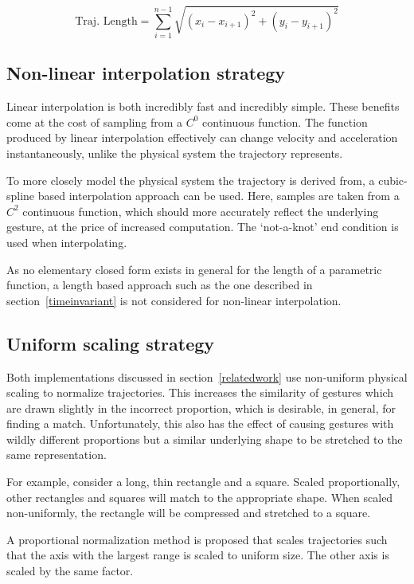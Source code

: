 \documentclass[12pt,journal,compsoc]{IEEEtran}
\begin{document}
\begin{equation} \label{distanceinterpolation}
\textrm{Traj. Length} = \sum_{i=1}^{n-1}{\sqrt{(x_i - x_{i+1})^2 + (y_i - y_{i+1})^2}}
\end{equation}

\subsection{Non-linear interpolation strategy}

Linear interpolation is both incredibly fast and incredibly simple. These benefits come at 
the cost of sampling from a $C^0$ continuous function. The function produced by linear
interpolation effectively can change velocity and acceleration instantaneously, unlike
the physical system the trajectory represents.
\par
To more closely model the physical system the trajectory is derived from, a cubic-spline based
interpolation approach can be used. Here, samples are taken from a $C^2$ continuous function,
which should more accurately reflect the underlying gesture, at the price of increased computation.
The `not-a-knot' end condition is used when interpolating.
\par
As no elementary closed form exists in general for the length of a parametric function, a
length based approach such as the one described in section~\ref{timeinvariant} is not considered
for non-linear interpolation.

\subsection{Uniform scaling strategy}

Both implementations discussed in section~\ref{relatedwork} use non-uniform
physical scaling to normalize trajectories. This increases the similarity of
gestures which are drawn slightly in the incorrect proportion, which is
desirable, in general, for finding a match. Unfortunately, this also has the
effect of causing gestures with wildly different proportions but a similar
underlying shape to be stretched to the same representation.
\par
For example, consider a long, thin rectangle and a square. Scaled proportionally,
other rectangles and squares will match to the appropriate shape. When scaled
non-uniformly, the rectangle will be compressed and stretched to a square.
\par
A proportional normalization method is proposed that scales trajectories such
that the axis with the largest range is scaled to uniform size. The other axis
is scaled by the same factor.
\end{document}

